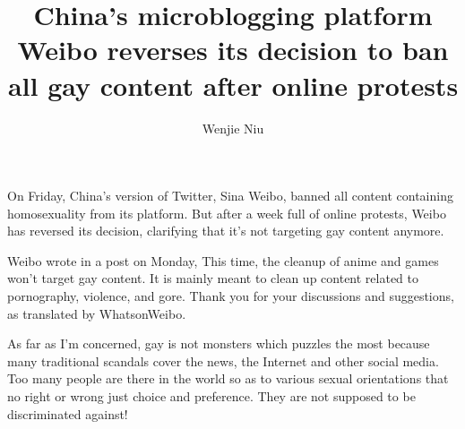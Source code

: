 \documentclass{article}
\author{Wenjie Niu}
\title{China’s microblogging platform Weibo reverses its decision to ban all gay content after online protests}
\begin{document}
\maketitle
On Friday, China’s version of Twitter, Sina Weibo, banned all content containing homosexuality from its platform. But after a week full of online protests, Weibo has reversed its decision, clarifying that it’s not targeting gay content anymore. 

Weibo wrote in a post on  Monday, This time, the cleanup of anime and games won’t target gay content. It is mainly meant to clean up content related to pornography, violence, and gore. Thank you for your discussions and suggestions, as translated by WhatsonWeibo.

	As far as I’m concerned, gay is not monsters which puzzles the most because many traditional scandals cover the news, the Internet and other social media. Too many people are there in the world so as to various sexual orientations that no right or wrong just choice and preference. They are not supposed to be discriminated against! 
\end{document}
